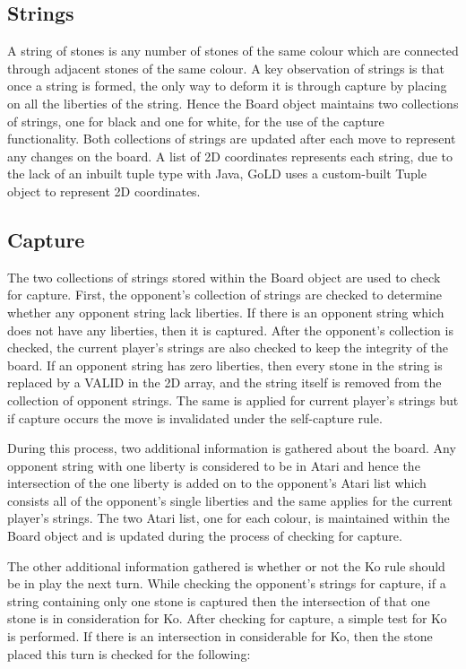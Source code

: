 \documentclass{l4proj}
\begin{document}
\subsection{Strings}
A string of stones is any number of stones of the same colour which are connected through adjacent stones of the same colour. A key observation of strings is that once a string is formed, the only way to deform it is through capture by placing on all the liberties of the string. Hence the Board object maintains two collections of strings, one for black and one for white, for the use of the capture functionality. Both collections of strings are updated after each move to represent any changes on the board. A list of 2D coordinates represents each string, due to the lack of an inbuilt tuple type with Java, GoLD uses a custom-built Tuple object to represent 2D coordinates.

\subsection{Capture}
The two collections of strings stored within the Board object are used to check for capture. First, the opponent's collection of strings are checked to determine whether any opponent string lack liberties. If there is an opponent string which does not have any liberties, then it is captured. After the opponent's collection is checked, the current player's strings are also checked to keep the integrity of the board. If an opponent string has zero liberties, then every stone in the string is replaced by a VALID in the 2D array, and the string itself is removed from the collection of opponent strings. The same is applied for current player's strings but if capture occurs the move is invalidated under the self-capture rule.

During this process, two additional information is gathered about the board. Any opponent string with one liberty is considered to be in Atari and hence the intersection of the one liberty is added on to the opponent’s Atari list which consists all of the opponent’s single liberties and the same applies for the current player's strings. The two Atari list, one for each colour, is maintained within the Board object and is updated during the process of checking for capture.

The other additional information gathered is whether or not the Ko rule should be in play the next turn. While checking the opponent’s strings for capture, if a string containing only one stone is captured then the intersection of that one stone is in consideration for Ko. After checking for capture, a simple test for Ko is performed. If there is an intersection in considerable for Ko, then the stone placed this turn is checked for the following:
\end{document}
